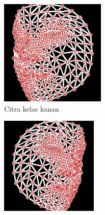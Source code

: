 \begin{figure}[H]
  \centering
  \begin{subfigure}{0.3\textwidth}
      \centering
      \includegraphics[width=\linewidth]{gambar/50 kanan.jpg}
      \caption{Citra kelas kanan}
      \label{fig:image1}
  \end{subfigure}
  \hfill
  \begin{subfigure}{0.3\textwidth}
      \centering
      \includegraphics[width=\linewidth]{gambar/50 kiri.jpg}

\end{subfigure}
\end{figure}
